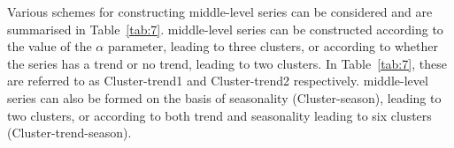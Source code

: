 \documentclass[a4paper,review,12pt,authoryear]{elsarticle}
\begin{document}
Various schemes for constructing middle-level series can be considered and are summarised in Table~\ref{tab:7}. middle-level series can be constructed according to the value of the $\alpha$ parameter, leading to three clusters, or according to whether the series has a trend or no trend, leading to two clusters. In Table~\ref{tab:7}, these are referred to as Cluster-trend1 and Cluster-trend2 respectively. middle-level series can also be formed on the basis of seasonality (Cluster-season), leading to two clusters, or according to both trend and seasonality leading to six clusters (Cluster-trend-season).








\end{document}
